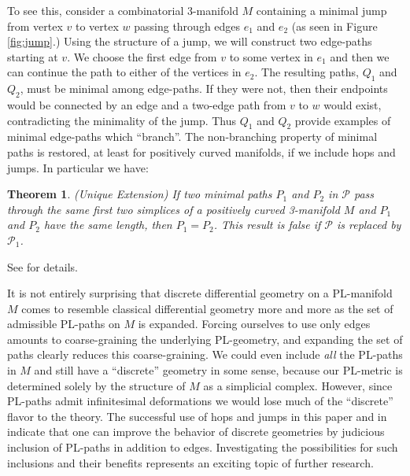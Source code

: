 \documentclass[12pt]{article}
\theoremstyle{plain}
\newtheorem{theorem}{Theorem}
\theoremstyle{definition}
\theoremstyle{remark}
\begin{document}
To see this, consider a combinatorial 3-manifold $M$ containing a minimal jump from vertex $v$ to vertex $w$ passing through edges $e_1$ and $e_2$ (as seen in Figure \ref{fig:jump}.) Using the structure of a jump, we will construct two edge-paths starting at $v$. We choose the first edge from $v$ to some vertex in $e_1$ and then we can continue the path to either of the vertices in $e_2$. The resulting paths, $Q_1$ and $Q_2$, must be minimal among edge-paths. If they were not, then their endpoints would be connected by an edge and a two-edge path from $v$ to $w$ would exist, contradicting the minimality of the jump. Thus $Q_1$ and $Q_2$ provide examples of minimal edge-paths which ``branch''. The non-branching property of minimal paths is restored, at least for positively curved manifolds, if we include hops and jumps. In particular we have:

\begin{theorem}(Unique Extension) If two minimal paths $P_1$ and $P_2$ in $\mathcal{P}$ pass through the same first two simplices of a positively curved 3-manifold $M$ and $P_1$ and $P_2$ have the same length, then $P_1 = P_2$. This result is false if $\mathcal{P}$ is replaced by $\mathcal{P}_1$.
\end{theorem}

\noindent See \cite{Trout10} for details.

It is not entirely surprising that discrete differential geometry on a PL-manifold $M$ comes to resemble classical differential geometry more and more as the set of admissible PL-paths on $M$ is expanded. Forcing ourselves to use only edges amounts to coarse-graining the underlying PL-geometry, and expanding the set of paths clearly reduces this coarse-graining. We could even include {\em all} the PL-paths in $M$ and still have a ``discrete'' geometry in some sense, because our PL-metric is determined solely by the structure of $M$ as a simplicial complex. However, since PL-paths admit infinitesimal deformations we would lose much of the ``discrete'' flavor to the theory. The successful use of hops and jumps in this paper and in \cite{Trout10} indicate that one can improve the behavior of discrete geometries by judicious inclusion of PL-paths in addition to edges. Investigating the possibilities for such inclusions and their benefits represents an exciting topic of further research.



% 
\end{document}
